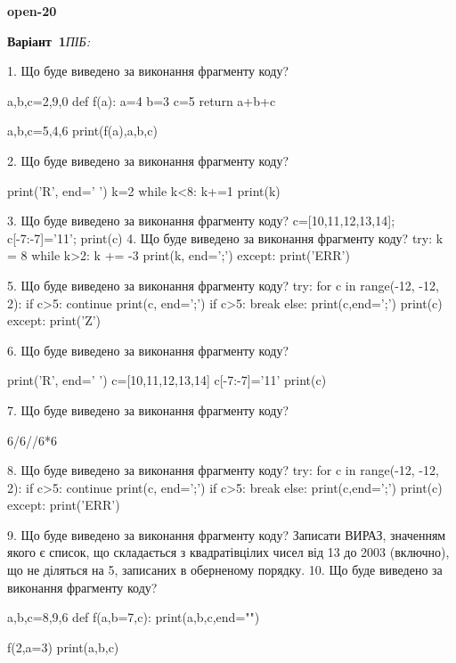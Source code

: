 \documentclass[11pt]{article}
\begin{document}
{\large\textbf{open-20}}

\textbf{Варіант \No\,1}\hfill \textit{ПІБ:}\,\underline{\hspace{60mm}}
\vspace{4mm}

1. Що буде виведено за виконання фрагменту коду?

a,b,c=2,9,0
def f(a):
    a=4
    b=3
    c=5
    return a+b+c

a,b,c=5,4,6
print(f(a),a,b,c)

2. Що буде виведено за виконання фрагменту коду?

print('R', end=' ')
k=2
while k<8:
    k+=1
print(k)


3. Що буде виведено за виконання фрагменту коду?
c=[10,11,12,13,14]; c[-7:-7]='11'; print(c)
4. Що буде виведено за виконання фрагменту коду?
try:
    k = 8
    while k>2:
        k += -3
    print(k, end=';')
except:
    print('ERR')

5. Що буде виведено за виконання фрагменту коду?
try:
    for c in range(-12, -12, 2):
        if c>5:
            continue
        print(c, end=';')
        if c>5:
            break
    else:
        print(c,end=';')
    print(c)
except:
    print('Z')

6. Що буде виведено за виконання фрагменту коду?

print('R', end=' ')
c=[10,11,12,13,14]
c[-7:-7]='11'
print(c)


7. Що буде виведено за виконання фрагменту коду?

6/6//6*6

8. Що буде виведено за виконання фрагменту коду?
try:
    for c in range(-12, -12, 2):
        if c>5:
            continue
        print(c, end=';')
        if c>5:
            break
    else:
        print(c,end=';')
    print(c)
except:
    print('ERR')

9. Що буде виведено за виконання фрагменту коду?
Записати ВИРАЗ, значенням якого є список, що складається з квадратівцілих чисел від 13 до 2003 (включно), що не діляться на 5, записаних в оберненому порядку.
10. Що буде виведено за виконання фрагменту коду?

a,b,c=8,9,6
def f(a,b=7,c):
    print(a,b,c,end="")

f(2,a=3)
print(a,b,c)
\end{document}
